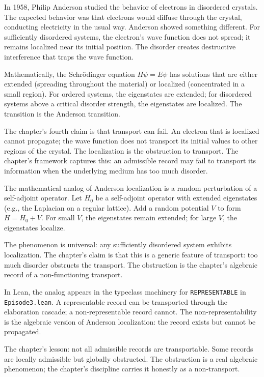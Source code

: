In 1958, Philip Anderson studied the behavior of electrons in
disordered crystals. The expected behavior was that electrons would
diffuse through the crystal, conducting electricity in the usual
way. Anderson showed something different. For sufficiently
disordered systems, the electron's wave function does not spread;
it remains localized near its initial position. The disorder
creates destructive interference that traps the wave function.

Mathematically, the Schr\"odinger equation $H \psi = E \psi$ has
solutions that are either extended (spreading throughout the
material) or localized (concentrated in a small region). For
ordered systems, the eigenstates are extended; for disordered
systems above a critical disorder strength, the eigenstates are
localized. The transition is the Anderson transition.

The chapter's fourth claim is that transport can fail. An electron
that is localized cannot propagate; the wave function does not
transport its initial values to other regions of the crystal.
The localization is the obstruction to transport. The chapter's
framework captures this: an admissible record may fail to
transport its information when the underlying medium has too
much disorder.

The mathematical analog of Anderson localization is a random
perturbation of a self-adjoint operator. Let $H_0$ be a
self-adjoint operator with extended eigenstates (e.g., the
Laplacian on a regular lattice). Add a random potential $V$ to
form $H = H_0 + V$. For small $V$, the eigenstates remain
extended; for large $V$, the eigenstates localize.

The phenomenon is universal: any sufficiently disordered system
exhibits localization. The chapter's claim is that this is a
generic feature of transport: too much disorder obstructs the
transport. The obstruction is the chapter's algebraic record of a
non-functioning transport.

In Lean, the analog appears in the typeclass machinery for
\texttt{REPRESENTABLE} in \texttt{Episode3.lean}. A representable
record can be transported through the elaboration cascade; a
non-representable record cannot. The non-representability is
the algebraic version of Anderson localization: the record exists
but cannot be propagated.

The chapter's lesson: not all admissible records are
transportable. Some records are locally admissible but globally
obstructed. The obstruction is a real algebraic phenomenon; the
chapter's discipline carries it honestly as a non-transport.

